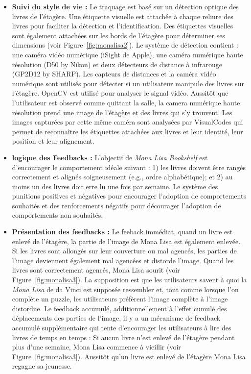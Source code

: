 \documentclass[10pt,a5paper,twoside]{article}
\begin{document}
\begin{itemize}
\itemsep1pt\parskip0pt
\item
  \textbf{Suivi du style de vie :} Le traquage est basé sur un détection
  optique des livres de l'étagère. Une étiquette visuelle est attachée à
  chaque reliure des livres pour faciliter la détection et
  l'identification. Des étiquettes visuelles sont également attachées
  sur les bords de l'étagère pour déterminer ses dimensions (voir
  Figure~\ref{fig:monalisa2}). Le système de détection contient : une
  caméra vidéo numérique (iSight de Apple), une caméra numérique haute
  résolution (D50 by Nikon) et deux détecteurs de distance à infrarouge
  (GP2D12 by SHARP). Les capteurs de distances et la caméra vidéo
  numérique sont utilisés pour détecter si un utilisateur manipule des
  livres sur l'étagère. OpenCV est utilisé pour analyser le signal
  vidéo. Aussitôt que l'utilisateur est observé comme quittant la salle,
  la camera numérique haute résolution prend une image de l'étagère et
  des livres qui s'y trouvent. Les images capturées par cette même
  caméra sont analysées par VisualCodes qui permet de reconnaître les
  étiquettes attachées aux livres et leur identité, leur position et
  leur alignement.
\item
  \textbf{logique des Feedbacks :} L'objectif de \emph{Mona Lisa
  Bookshelf} est d'encourager le comportement idéale suivant : 1) les
  livres doivent être rangés correctement et alignés soigneusement
  (e.g., ordre alphabétique); et 2) au moins un des livres doit erre lu
  une fois par semaine. Le système des punitions positives et négatives
  pour encourager l'adoption de comportements souhaités et des
  renforcements négatifs pour décourager l'adoption de comportements non
  souhaités.
\item
  \textbf{Présentation des feedbacks :} Le feeback immédiat, quand un
  livre est enlevé de l'étagère, la partie de l'image de Mona Lisa est
  également enlevée. Si les livres sont allongés sur leur couverture ou
  mal agencés, les parties de l'image deviennent également mal agencées
  et distorde l'image. Quand les livres sont correctement agencés, Mona
  Lisa sourit (voir Figure~\ref{fig:monalisa3}). La supposition est que
  les utilisateurs savent à quoi la \emph{Mona Lisa} de da Vinci est
  supposée ressembler et, tout comme lorsque l'on complète un puzzle,
  les utilisateurs préfèrent l'image complète à l'image distordue. Le
  feedback accumulé, additionnellement à l'effet cumulé des déplacements
  des parties de l'image, il y a un mécanisme de feedback accumulé
  supplémentaire qui tente d'encourager les utilisateurs à lire des
  livres de temps en temps : Si aucun livre n'est enlevé de l'étagère
  pendant plus d'une semaine, Mona Lisa commence à vieillir (voir
  Figure~\ref{fig:monalisa3}). Aussitôt qu'un livre est enlevé de
  l'étagère Mona Lisa regagne sa jeunesse.
\end{itemize}
\end{document}
